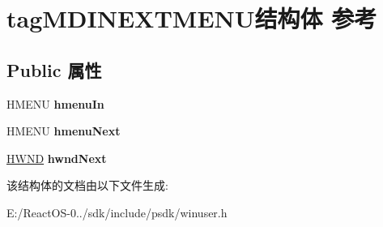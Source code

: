 \hypertarget{structtag_m_d_i_n_e_x_t_m_e_n_u}{}\section{tag\+M\+D\+I\+N\+E\+X\+T\+M\+E\+N\+U结构体 参考}
\label{structtag_m_d_i_n_e_x_t_m_e_n_u}
\subsection*{Public 属性}
\begin{DoxyCompactItemize}
\item 
\mbox{\label{structtag_m_d_i_n_e_x_t_m_e_n_u_a641feea0a37cf67efa56e2b47e260a78}} 
H\+M\+E\+NU {\bfseries hmenu\+In}
\item 
\mbox{\label{structtag_m_d_i_n_e_x_t_m_e_n_u_a3bbcd75888aa99ed5c00f4632e0359b9}} 
H\+M\+E\+NU {\bfseries hmenu\+Next}
\item 
\mbox{\label{structtag_m_d_i_n_e_x_t_m_e_n_u_a5d11fd7f93cfcd7367005747b3c9b916}} 
\hyperlink{interfacevoid}{H\+W\+ND} {\bfseries hwnd\+Next}
\end{DoxyCompactItemize}


该结构体的文档由以下文件生成\+:\begin{DoxyCompactItemize}
\item 
E\+:/\+React\+O\+S-\/0../sdk/include/psdk/winuser.\+h\end{DoxyCompactItemize}
